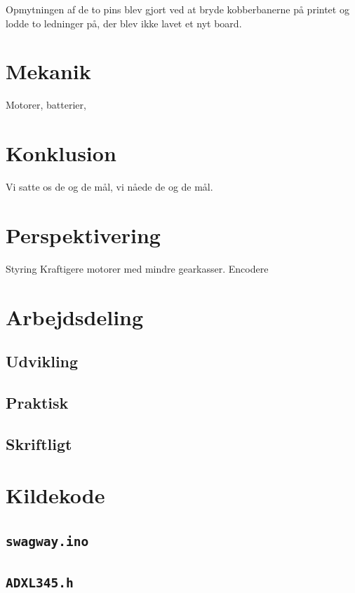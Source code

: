 \documentclass[a4paper,oneside,article,danish,table]{memoir}
\begin{document}
Opmytningen af de to pins blev gjort ved at bryde kobberbanerne på printet og lodde to ledninger på, der blev ikke lavet et nyt board.

\chapter{Mekanik}
Motorer, batterier, 
\chapter{Konklusion} \label{chap:kon}
Vi satte os de og de mål, vi nåede de og de mål.

\chapter{Perspektivering} \label{chap:per}
Styring
Kraftigere motorer med mindre gearkasser.
Encodere


\clearpage
\listoftables
\listoffigures
\nocite{*}
 
\clearpage \appendix

\chapter{Arbejdsdeling}

\section{Udvikling}
\section{Praktisk}
\section{Skriftligt}

\chapter{Kildekode}

\section{\texttt{swagway.ino}}

\section{\texttt{ADXL345.h}}

\end{document}
